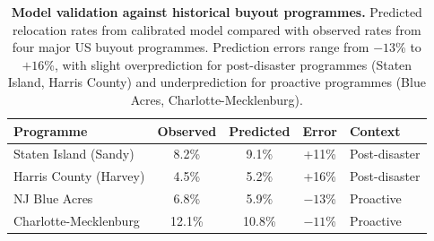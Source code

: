 \documentclass[12pt,a4paper]{article}
\begin{document}
\begin{table}[htbp]
\centering
\caption{\textbf{Model validation against historical buyout programmes.} Predicted relocation rates from calibrated model compared with observed rates from four major US buyout programmes. Prediction errors range from $-13$\% to $+16$\%, with slight overprediction for post-disaster programmes (Staten Island, Harris County) and underprediction for proactive programmes (Blue Acres, Charlotte-Mecklenburg).}
\label{tab:validation}
\begin{tabular}{lcccl}
\toprule
Programme & Observed & Predicted & Error & Context \\
\midrule
Staten Island (Sandy) & 8.2\% & 9.1\% & +11\% & Post-disaster \\
Harris County (Harvey) & 4.5\% & 5.2\% & +16\% & Post-disaster \\
NJ Blue Acres & 6.8\% & 5.9\% & $-13$\% & Proactive \\
Charlotte-Mecklenburg & 12.1\% & 10.8\% & $-11$\% & Proactive \\
\bottomrule
\end{tabular}
\end{table}
\end{document}
